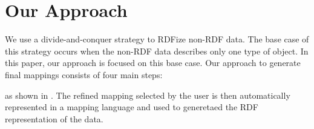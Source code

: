 


\section{Our Approach}\label{sec:approach}
We use a divide-and-conquer strategy to RDFize non-RDF data. The base case of this strategy occurs when the non-RDF data describes only one type of object. In this paper, our approach is focused on this base case. Our approach to generate final mappings consists of four main steps:
\begin{enumerate*}[label={\roman*)},font={\color{black}\bfseries}]
\item {}
\item { 
\item {}
\item {}
\end{enumerate*}
 as shown in . The refined mapping selected by the user is then automatically represented in a mapping language and used to generetaed the RDF representation of the data.
 
